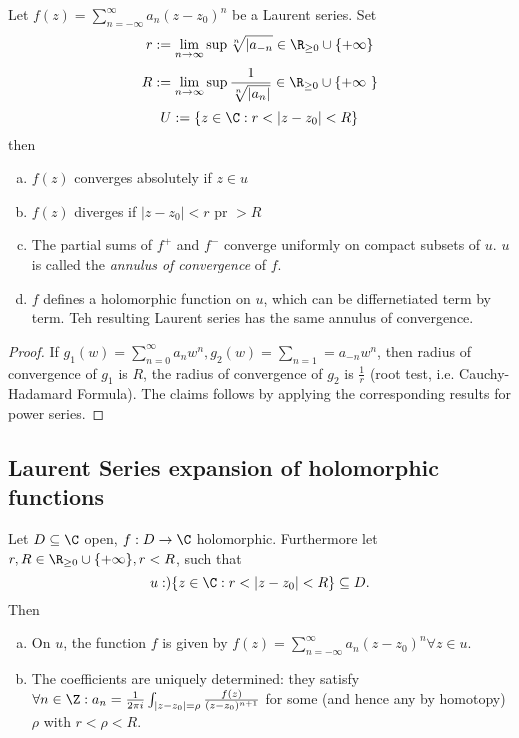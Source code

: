 \begin{remark}
  Let $f(z)=\sum_{n=-\infty}^{\infty}a_n(z-z_0)^n$ be a Laurent series. Set
    $$r:= \lim_{n\to \infty}\sup\sqrt[n]{|a_{-n}}\in \R_{\geq 0} \cup \{+\infty\}$$
    $$R:= \lim_{n\to \infty} \sup \frac{1}{\sqrt[n]{|a_n|}}\in \R_{\geq 0}\cup \{ + \infty \}$$
    $$U:=\{z\in \C : r < |z-z_0 | < R\}$$
    then
      \begin{enumerate}[(a)]
        \item $f(z)$ converges absolutely if $z\in u$
        \item $f(z)$ diverges  if $|z-z_0|<r$ pr $>R$
        \item The partial sums of $f^{+}$ and $f^{-}$ converge uniformly on compact subsets of $u$. $u$ is called the \emph{annulus of convergence }of $f$.
        \item $f$ defines a holomorphic function on $u$, which can be differnetiated term by term. Teh resulting Laurent series has the same annulus of convergence.
      \end{enumerate}
\end{remark}
\begin{proof}
  If $g_1(w)= \sum_{n=0}^{\infty}a_n w^n, g_2(w)=\sum_{n=1}=a_{-n}w^n$, then radius of convergence of $g_1$ is $R$, the radius of convergence of $g_2$ is $\frac{1}{r}$ (root test, i.e. Cauchy-Hadamard Formula). The claims follows by applying the corresponding results for power series.
\end{proof}

\subsection*{Laurent Series expansion of holomorphic functions}
Let $D\subseteq \C$ open, $f:D\to \C$ holomorphic. Furthermore let $r,R\in \R_{\geq0} \cup \{+\infty\}, r <R$, such that
  $$u: ) \{ z\in \C : r< |z-z_0| < R \} \subseteq D.$$
Then
  \begin{enumerate}[(a)]
    \item On $u$, the function $f$ is given by $f(z)=\sum_{n=-\infty}^{\infty}a_n(z-z_0)^n \forall z\in u$.
    \item The coefficients are uniquely determined: they satisfy $\forall n \in \Z: a_n = \frac{1}{2\pi i}\int_{|z-z_0|=\rho}\frac{f(z)}{(z-z_0)^{n+1}}$ for some (and hence any by homotopy) $\rho$ with $r < \rho <R$.
  \end{enumerate}

